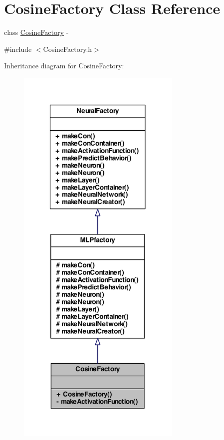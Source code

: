 \hypertarget{class_cosine_factory}{
\section{CosineFactory Class Reference}
\label{class_cosine_factory}
}


class \hyperlink{class_cosine_factory}{CosineFactory} -\/  




{\ttfamily \#include $<$CosineFactory.h$>$}



Inheritance diagram for CosineFactory:\nopagebreak
\begin{figure}[H]
\begin{center}
\leavevmode
\includegraphics[width=222pt]{class_cosine_factory__inherit__graph}
\end{center}
\end{figure}


